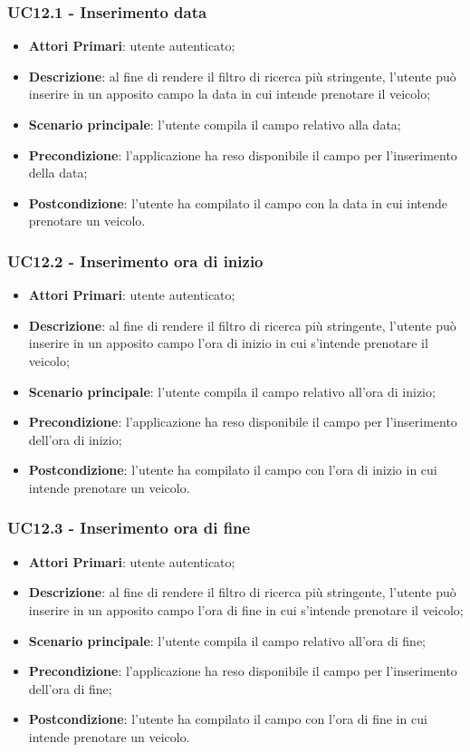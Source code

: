 \subsubsection{UC12.1 - Inserimento data}
\begin{itemize}
	\item \textbf{Attori Primari}: utente autenticato;
	\item \textbf{Descrizione}: al fine di rendere il filtro di ricerca più stringente, l'utente può inserire in un apposito campo la data in cui intende prenotare il veicolo;
	\item \textbf{Scenario principale}: l'utente compila il campo relativo alla data;	
	\item \textbf{Precondizione}: l'applicazione ha reso disponibile il campo per l'inserimento della data;
	\item \textbf{Postcondizione}: l'utente ha compilato il campo con la data in cui intende prenotare un veicolo.	
\end{itemize}
\subsubsection{UC12.2 - Inserimento ora di inizio}
\begin{itemize}
	\item \textbf{Attori Primari}: utente autenticato;
	\item \textbf{Descrizione}: al fine di rendere il filtro di ricerca più stringente, l'utente può inserire in un apposito campo l'ora di inizio in cui s'intende prenotare il veicolo;
	\item \textbf{Scenario principale}: l'utente compila il campo relativo all'ora di inizio;	
	\item \textbf{Precondizione}: l'applicazione ha reso disponibile il campo per l'inserimento dell'ora di inizio;
	\item \textbf{Postcondizione}: l'utente ha compilato il campo con l'ora di inizio in cui intende prenotare un veicolo.	
\end{itemize}
\subsubsection{UC12.3 - Inserimento ora di fine}
\begin{itemize}
	\item \textbf{Attori Primari}: utente autenticato;
	\item \textbf{Descrizione}: al fine di rendere il filtro di ricerca più stringente, l'utente può inserire in un apposito campo l'ora di fine in cui s'intende prenotare il veicolo;
	\item \textbf{Scenario principale}: l'utente compila il campo relativo all'ora di fine;	
	\item \textbf{Precondizione}: l'applicazione ha reso disponibile il campo per l'inserimento dell'ora di fine;
	\item \textbf{Postcondizione}: l'utente ha compilato il campo con l'ora di fine in cui intende prenotare un veicolo.	
\end{itemize}
